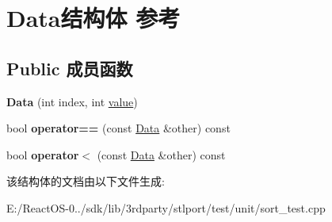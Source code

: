 \hypertarget{struct_data}{}\section{Data结构体 参考}
\label{struct_data}
\subsection*{Public 成员函数}
\begin{DoxyCompactItemize}
\item 
\mbox{\label{struct_data_abef6a72b1b8cb6ce306405112dd08faf}} 
{\bfseries Data} (int index, int \hyperlink{unionvalue}{value})
\item 
\mbox{\label{struct_data_ac5d7316b8993b13a5b9c81b76f25aa04}} 
bool {\bfseries operator==} (const \hyperlink{struct_data}{Data} \&other) const
\item 
\mbox{\label{struct_data_aa04ec7e4a920431117d3150de0c002b8}} 
bool {\bfseries operator$<$} (const \hyperlink{struct_data}{Data} \&other) const
\end{DoxyCompactItemize}


该结构体的文档由以下文件生成\+:\begin{DoxyCompactItemize}
\item 
E\+:/\+React\+O\+S-\/0../sdk/lib/3rdparty/stlport/test/unit/sort\+\_\+test.\+cpp\end{DoxyCompactItemize}
